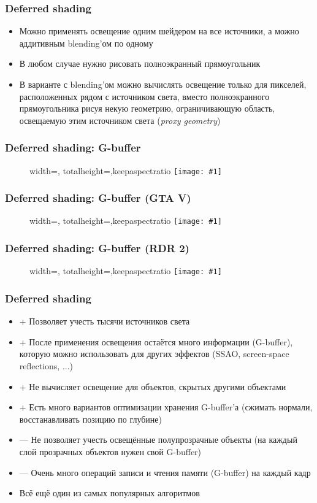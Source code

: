 \documentclass[10pt]{beamer}
\newcommand{\slideimage}[1]{
  \begin{figure}
    \begin{adjustbox}{width=\textwidth, totalheight=\textheight-2\baselineskip-2\baselineskip,keepaspectratio}
      \texttt{[image: \#1]}
    \end{adjustbox}
  \end{figure}
}
\begin{document}
\begin{frame}[fragile]
\frametitle{Deferred shading}
\begin{itemize}
\item Можно применять освещение одним шейдером на все источники, а можно аддитивным blending'ом по одному
\pause
\item В любом случае нужно рисовать полноэкранный прямоугольник
\pause
\item В варианте с blending'ом можно вычислять освещение только для пикселей, расположенных рядом с источником света, вместо полноэкранного прямоугольника рисуя некую геометрию, ограничивающую область, освещаемую этим источником света (\textit{proxy geometry})
\end{itemize}
\end{frame}

\begin{frame}[fragile]
\frametitle{Deferred shading: G-buffer}
\slideimage{g_buffer.png}
\end{frame}

\begin{frame}[fragile]
\frametitle{Deferred shading: G-buffer (GTA V)}
\slideimage{gta.jpg}
\end{frame}

\begin{frame}[fragile]
\frametitle{Deferred shading: G-buffer (RDR 2)}
\slideimage{rdr2.jpg}
\end{frame}

\begin{frame}[fragile]
\frametitle{Deferred shading}
\begin{itemize}
\item {\color{green}+} Позволяет учесть тысячи источников света
\item {\color{green}+} После применения освещения остаётся много информации (G-buffer), которую можно использовать для других эффектов (SSAO, screen-space reflections, ...)
\item {\color{green}+} Не вычисляет освещение для объектов, скрытых другими объектами
\item {\color{green}+} Есть много вариантов оптимизации хранения G-buffer'а (сжимать нормали, восстанавливать позицию по глубине)
\item {\color{red}—} Не позволяет учесть освещённые полупрозрачные объекты (на каждый слой прозрачных объектов нужен свой G-buffer)
\item {\color{red}—} Очень много операций записи и чтения памяти (G-buffer) на каждый кадр
\item Всё ещё один из самых популярных алгоритмов
\end{itemize}
\end{frame}
\end{document}
